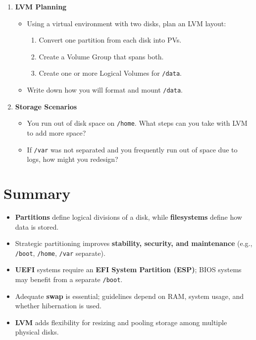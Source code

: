 \documentclass[12pt,a4paper]{report}
\begin{document}
\begin{enumerate}
    \item \textbf{LVM Planning}  
    \begin{itemize}
        \item Using a virtual environment with two disks, plan an LVM layout:  
        \begin{enumerate}
            \item Convert one partition from each disk into PVs.  
            \item Create a Volume Group that spans both.  
            \item Create one or more Logical Volumes for \texttt{/data}.  
        \end{enumerate}
        \item Write down how you will format and mount \texttt{/data}.
    \end{itemize}

    \item \textbf{Storage Scenarios}  
    \begin{itemize}
        \item You run out of disk space on \texttt{/home}. What steps can you take with LVM to add more space?  
        \item If \texttt{/var} was not separated and you frequently run out of space due to logs, how might you redesign?
    \end{itemize}
\end{enumerate}



\section*{Summary}

\begin{itemize}
    \item \textbf{Partitions} define logical divisions of a disk, while \textbf{filesystems} define how data is stored.  
    \item Strategic partitioning improves \textbf{stability, security, and maintenance} (e.g., \texttt{/boot}, \texttt{/home}, \texttt{/var} separate).  
    \item \textbf{UEFI} systems require an \textbf{EFI System Partition (ESP)}; BIOS systems may benefit from a separate \texttt{/boot}.  
    \item Adequate \textbf{swap} is essential; guidelines depend on RAM, system usage, and whether hibernation is used.  
    \item \textbf{LVM} adds flexibility for resizing and pooling storage among multiple physical disks.  
\end{itemize}
\end{document}
